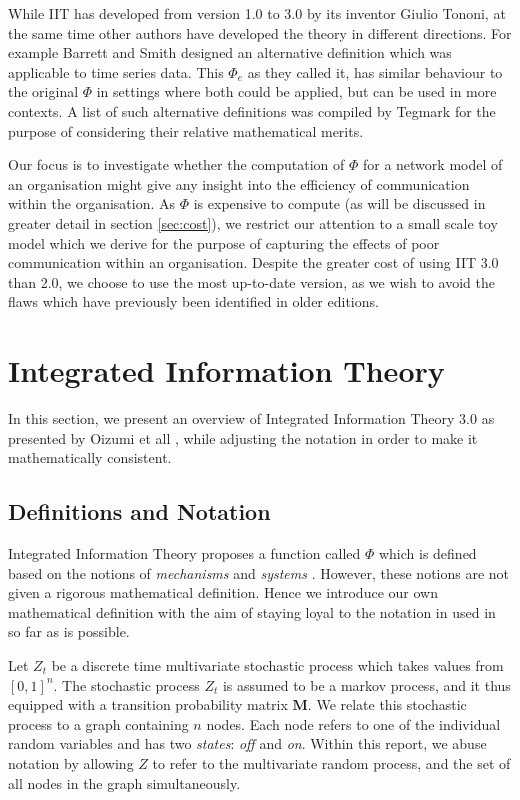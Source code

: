 While IIT has developed from version 1.0 to 3.0 by its inventor Giulio Tononi, at the same time other authors have developed the theory in different directions. For example Barrett and Smith \cite{barrett2011practical} designed an alternative definition which was applicable to time series data. This $\Phi_e$ as they called it, has similar behaviour to the original $\Phi$ in settings where both could be applied, but can be used in more contexts. A list of such alternative definitions was compiled by Tegmark \cite{tegmark2016improved} for the purpose of considering their relative mathematical merits.

Our focus is to investigate whether the computation of $\Phi$ for a network model of an organisation might give any insight into the efficiency of communication within the organisation. As $\Phi$ is expensive to compute (as will be discussed in greater detail in section \ref{sec:cost}), we restrict our attention to a small scale toy model which we derive for the purpose of capturing the effects of poor communication within an organisation. Despite the greater cost of using IIT 3.0 than 2.0, we choose to use the most up-to-date version, as we wish to avoid the flaws which have previously been identified in older editions.

\section{Integrated Information Theory}
\label{sec:iit}

In this section, we present an overview of Integrated Information Theory 3.0 as presented by Oizumi et all \cite{oizumi2014phenomenology}, while adjusting the notation in order to make it mathematically consistent.
	
\subsection{Definitions and Notation}

Integrated Information Theory proposes a function called $\Phi$ which is defined based on the notions of \textit{mechanisms} and \textit{systems} \cite{oizumi2014phenomenology}. However, these notions are not given a rigorous mathematical definition. Hence we introduce our own mathematical definition with the aim of staying loyal to the notation in used in \cite{krohn2016computing} so far as is possible.

Let $Z_t$ be a discrete time multivariate stochastic process which takes values from $[0,1]^n$.  The stochastic process $Z_t$ is assumed to be a markov process, and it thus equipped with a transition probability matrix $\mathbf{M}$. We relate this stochastic process to a graph containing $n$ nodes. Each node refers to one of the individual random variables and has two \textit{states}: \textit{off}  and \textit{on}. Within this report, we abuse notation by allowing $Z$ to refer to the multivariate random process, and the set of all nodes in the graph simultaneously. 

